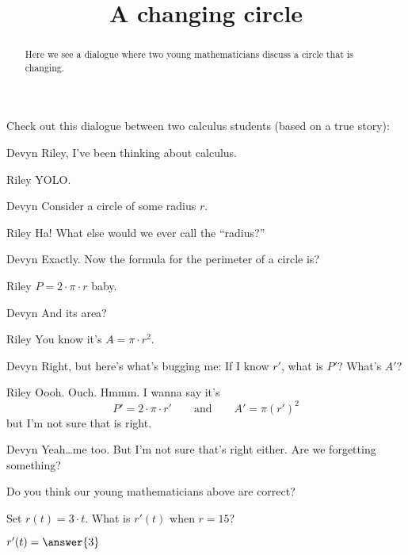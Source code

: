 \documentclass{ximera}
\title[Break-Ground:]{A changing circle}
\begin{document}
\begin{abstract}
Here we see a dialogue where two young mathematicians discuss a circle
that is changing.
\end{abstract}
\maketitle

Check out this dialogue between two calculus students (based on a true
story):

\begin{dialogue}
  \item[Devyn] Riley, I've been thinking about calculus.   
  \item[Riley] YOLO.
  \item[Devyn] Consider a circle of some radius $r$.
  \item[Riley] Ha! What else would we ever call the ``radius?''
  \item[Devyn] Exactly. Now the formula for the perimeter of
    a circle is?
  \item[Riley] $P=2\cdot\pi \cdot r$ baby.
  \item[Devyn] And its area?
  \item[Riley] You know it's $A=\pi\cdot r^2$.
  \item[Devyn] Right, but here's what's bugging me: If I know
    $r'$, what is $P'$? What's $A'$?
  \item[Riley] Oooh. Ouch. Hmmm. I wanna say it's
    \[
    P' = 2\cdot\pi \cdot r' \qquad\text{and}\qquad  A' = \pi (r')^2 
    \]
    but I'm not sure that is right.
  \item[Devyn] Yeah\dots me too. But I'm not sure that's
    right either. Are we forgetting something?
\end{dialogue}
  
\begin{problem}
  Do you think our young mathematicians above are correct?
  \begin{multipleChoice}
  \end{multipleChoice}
\end{problem}

\begin{problem}
  Set $r(t)=3\cdot t$. What is $r'(t)$ when $r=15$?
  \begin{prompt}
    $r'(t)=\answer{3}$
  \end{prompt}
\end{problem}
\end{document}

